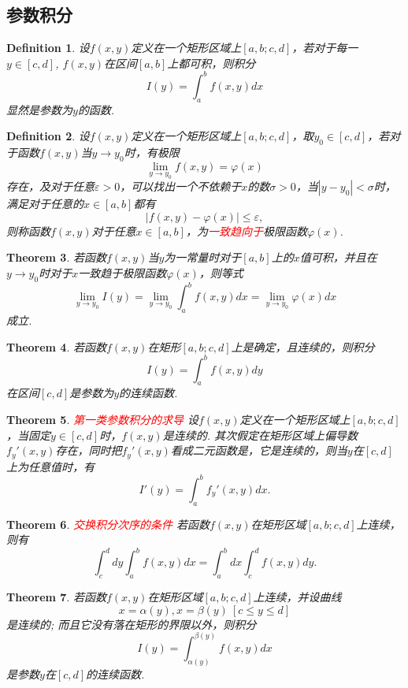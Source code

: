 \documentclass{article}
\newtheorem{theorem}{Theorem}[section]
\newtheorem{definition}[theorem]{Definition}
\newcommand{\redt}[1]{\textcolor{red}{#1}}
\begin{document}
\subsection{参数积分}

\begin{definition}
\rm 设$f(x,y)$定义在一个矩形区域上$[a,b;c,d]$，若对于每一$y \in [c,d]$, $f(x,y)$在区间$[a,b]$上都可积，则积分
$$
I(y) = \int_a^b f(x,y)dx
$$
显然是参数为$y$的函数. 
\end{definition}

\begin{definition}
\rm 设$f(x,y)$定义在一个矩形区域上$[a,b;c,d]$，取$y_0 \in [c,d]$，若对于函数$f(x,y)$当$y \to y_0$时，有极限
$$
\lim\limits_{y \to y_0} f(x,y) = \varphi(x)
$$
存在，及对于任意$\varepsilon > 0$，可以找出一个不依赖于$x$的数$\sigma > 0$，当$|y-y_0|< \sigma$时，满足对于任意的$x \in [a,b]$都有
$$
|f(x,y)-\varphi(x)|\leq \varepsilon,
$$
则称函数$f(x,y)$对于任意$x \in [a,b]$，为\redt{一致趋向于}极限函数$\varphi(x)$. 
\end{definition}

\begin{theorem}
\rm 若函数$f(x,y)$当$y$为一常量时对于$[a,b]$上的$x$值可积，并且在$y \to y_0$时对于$x$一致趋于极限函数$\varphi(x)$，则等式
$$
\lim\limits_{y \to y_0} I(y) = \lim\limits_{y \to y_0}\int_a^{b} f(x,y)dx = \lim\limits_{y \to y_0} \varphi(x)dx 
$$
成立.
\end{theorem}

\begin{theorem}
\rm 若函数$f(x,y)$在矩形$[a,b;c,d]$上是确定，且连续的，则积分
$$
I(y) = \int_a^b f(x,y)dy
$$
在区间$[c,d]$是参数为$y$的连续函数. 
\end{theorem}

\begin{theorem}
\rm \redt{第一类参数积分的求导} 设$f(x,y)$定义在一个矩形区域上$[a,b;c,d]$，当固定$y \in [c,d]$时，$f(x,y)$是连续的. 其次假定在矩形区域上偏导数$f_y'(x,y)$存在，同时把$f_y'(x,y)$看成二元函数是，它是连续的，则当$y$在$[c,d]$上为任意值时，有
$$
I'(y) = \int_a^b f_y'(x,y)dx.
$$
\end{theorem}

\begin{theorem}
\rm \redt{交换积分次序的条件} 若函数$f(x,y)$在矩形区域$[a,b;c,d]$上连续，则有
$$
\int_c^d dy \int_a^b f(x,y)dx = \int_a^b dx \int_c^d f(x,y)dy. 
$$
\end{theorem}

\begin{theorem}
\rm 若函数$f(x,y)$在矩形区域$[a,b;c,d]$上连续，并设曲线
$$
x=\alpha(y),x=\beta(y) ~ [c \leq y \leq d]
$$
是连续的; 而且它没有落在矩形的界限以外，则积分
$$
I(y) = \int_{\alpha(y)}^{\beta(y)} f(x,y)dx
$$
是参数$y$在$[c,d]$的连续函数. 
\end{theorem}
\end{document}
